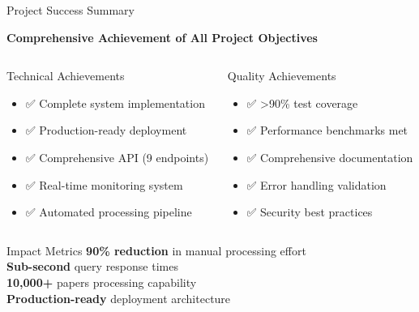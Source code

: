 \documentclass[aspectratio=169]{beamer}
\begin{document}
\begin{frame}{Project Success Summary}
    \begin{center}
        \textbf{Comprehensive Achievement of All Project Objectives}
    \end{center}
    
    \vspace{0.5cm}
    
    \begin{columns}[c]
        \begin{column}{0.5\textwidth}
            \begin{block}{Technical Achievements}
                \begin{itemize}
                    \item ✅ Complete system implementation
                    \item ✅ Production-ready deployment
                    \item ✅ Comprehensive API (9 endpoints)
                    \item ✅ Real-time monitoring system
                    \item ✅ Automated processing pipeline
                \end{itemize}
            \end{block}
        \end{column}
        \begin{column}{0.5\textwidth}
            \begin{block}{Quality Achievements}
                \begin{itemize}
                    \item ✅ >90\% test coverage
                    \item ✅ Performance benchmarks met
                    \item ✅ Comprehensive documentation
                    \item ✅ Error handling validation
                    \item ✅ Security best practices
                \end{itemize}
            \end{block}
        \end{column}
    \end{columns}
    
    \vspace{0.5cm}
    
    \begin{alertblock}{Impact Metrics}
        \textbf{90\% reduction} in manual processing effort\\
        \textbf{Sub-second} query response times\\
        \textbf{10,000+} papers processing capability\\
        \textbf{Production-ready} deployment architecture
    \end{alertblock}
\end{frame}
\end{document}
